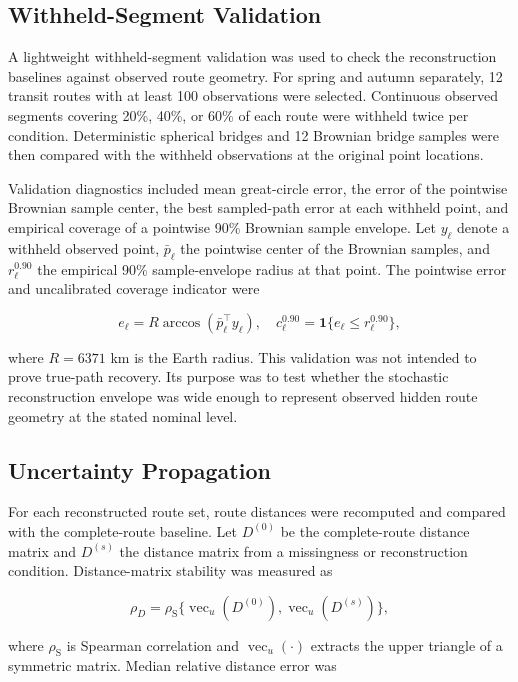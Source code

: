 \documentclass[pdflatex,sn-vancouver-num]{sn-jnl}
\begin{document}
\subsection{Withheld-Segment Validation}\label{withheld-segment-validation-methods}

A lightweight withheld-segment validation was used to check the reconstruction baselines against observed route geometry. For spring and autumn separately, 12 transit routes with at least 100 observations were selected. Continuous observed segments covering 20\%, 40\%, or 60\% of each route were withheld twice per condition. Deterministic spherical bridges and 12 Brownian bridge samples were then compared with the withheld observations at the original point locations.

Validation diagnostics included mean great-circle error, the error of the pointwise Brownian sample center, the best sampled-path error at each withheld point, and empirical coverage of a pointwise 90\% Brownian sample envelope. Let $y_\ell$ denote a withheld observed point, $\bar p_\ell$ the pointwise center of the Brownian samples, and $r_\ell^{0.90}$ the empirical 90\% sample-envelope radius at that point. The pointwise error and uncalibrated coverage indicator were

\[
e_\ell = R \arccos(\bar p_\ell^\top y_\ell),
\quad
c_\ell^{0.90} = \mathbf{1}\{e_\ell \le r_\ell^{0.90}\},
\]

where $R=6371$ km is the Earth radius. This validation was not intended to prove true-path recovery. Its purpose was to test whether the stochastic reconstruction envelope was wide enough to represent observed hidden route geometry at the stated nominal level.

\subsection{Uncertainty Propagation}\label{uncertainty-propagation-methods}

For each reconstructed route set, route distances were recomputed and compared with the complete-route baseline. Let $D^{(0)}$ be the complete-route distance matrix and $D^{(s)}$ the distance matrix from a missingness or reconstruction condition. Distance-matrix stability was measured as

\[
\rho_D = \rho_{\mathrm{S}}\{\operatorname{vec}_u(D^{(0)}),
\operatorname{vec}_u(D^{(s)})\},
\]

where $\rho_{\mathrm{S}}$ is Spearman correlation and $\operatorname{vec}_u(\cdot)$ extracts the upper triangle of a symmetric matrix. Median relative distance error was
\end{document}
